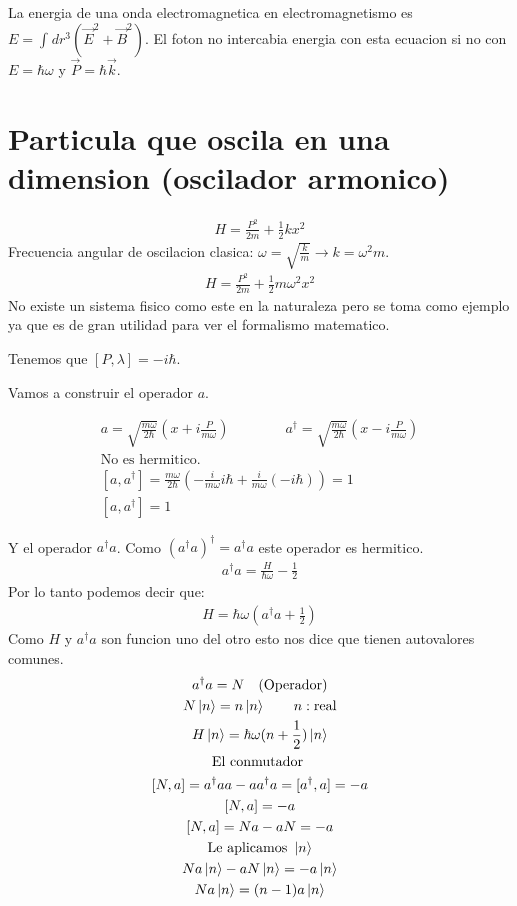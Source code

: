 \documentclass{article}
\begin{document}
La energia de una onda electromagnetica en electromagnetismo es $ E = \int_{}^{}dr ^ {3 } (\vec E ^2 + \vec B ^2) $. El foton no intercabia energia con esta ecuacion si no con $ E = \hbar \omega $ y $ \vec P  = \hbar \vec k $.

\section{Particula que oscila en una dimension (oscilador armonico)}
\begin{gather*}
  H = \frac{P ^2}{2m } + \frac{1}{2} k x ^2 
\end{gather*}
Frecuencia angular de oscilacion clasica: $ \omega = \sqrt{\frac{k }{m }}  \rightarrow k = \omega ^2 m $. 
\begin{gather*}
  H = \frac{P ^2 }{2m } + \frac{1}{2} m \omega ^2 x ^2
\end{gather*}
No existe un sistema fisico como este en la naturaleza pero se toma como ejemplo ya que es de gran utilidad para ver el formalismo matematico.

Tenemos que $ [P,\lambda] = -i \hbar $.

Vamos a construir el operador $ a $.

\begin{gather*}
  a = \sqrt{\frac{m \omega}{2 \hbar }} \left(x + i \frac{P }{m \omega}\right) \qquad \qquad a ^ {\dag } = \sqrt{\frac{m \omega}{2 \hbar }} \left(x - i \frac{P }{m \omega}\right)\\
  \text{No es hermitico.}\\
  [a, a ^ {\dag }] = \frac{m \omega}{2 \hbar } \left(- \frac{i }{m \omega }i \hbar  + \frac{i }{m \omega} (-i \hbar )\right) = 1\\
  [a, a ^ {\dag }] = 1
\end{gather*}

Y el operador $ a ^ {\dag }a  $. Como $ (a ^ {\dag } a )^ {\dag } = a ^ {\dag }a  $ este operador es hermitico.
\begin{gather*}
  a ^ {\dag }a  = \frac{H }{\hbar \omega} - \frac{1}{2}
\end{gather*}
Por lo tanto podemos decir que: 
\begin{gather*}
  H = \hbar \omega \left(a ^ {\dag }a + \frac{1}{2}\right)
\end{gather*}
Como $ H  $ y $ a^\dag a  $ son funcion uno del otro esto nos dice que tienen autovalores comunes.
\begin{gather*}
  a ^ {\dag }a = N \quad(\text{Operador}) \\
  N \ket{n } = n \ket{n }\qquad n:\text{real}\\
  H \ket{n } = \hbar \omega (n + \frac{1}{2}) \ket{n }\\
  \text{El conmutador }\\
  [N, a ] = a ^ {\dag }a a - a a ^ {\dag }a = [a ^ {\dag }, a] = -a \\
  [N, a ] = -a\\
  [N, a ] = Na - a N  = - a \\
  \text{Le aplicamos }\ket{n }\\
  Na \ket{n } - a N \ket{n } = - a \ket{n }\\
  Na \ket{n } = (n -1 )a \ket{n }
\end{gather*}
\end{document}
